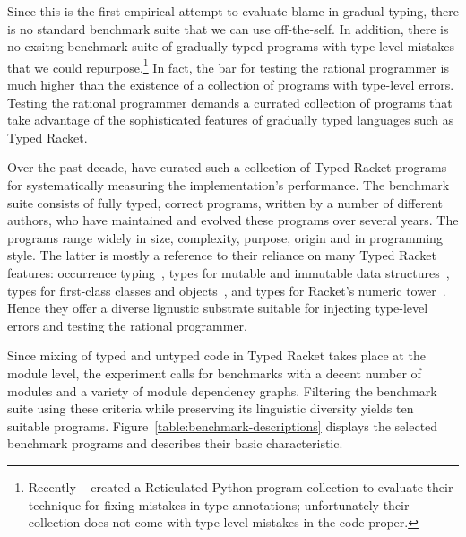 
Since this is the first empirical attempt to evaluate blame in gradual
typing, there is no standard benchmark suite that we can use off-the-self.
In addition, there is no exsitng benchmark suite of gradually typed
programs with type-level mistakes that we could
repurpose.\footnote{Recently ~\citet{cc-oopsla-20} created a
Reticulated Python program collection to evaluate their technique for
fixing mistakes in type annotations; unfortunately their collection does
not come with type-level mistakes in the code proper.} In fact, the bar
for testing the rational programmer is much higher than the existence of a
collection of programs with type-level errors. Testing the rational
programmer demands a currated collection of programs that take advantage
of the sophisticated features of gradually typed languages such as Typed
Racket. 

Over the past decade,  \citet{gtnffvf-jfp-2019} have curated such a
collection of Typed Racket programs for systematically measuring the
implementation's performance. The benchmark suite consists of fully typed,
correct programs, written by a number of different authors, who have
maintained and evolved these programs over several years. The programs
range widely in size, complexity, purpose, origin and in programming
style. The latter is mostly a reference to their reliance on many Typed
Racket features: occurrence typing~\cite{tf-icfp-2010}, types for mutable
and immutable data structures~\cite{hpst-sfp-2010}, types for first-class
classes and objects~\cite{tsdtf-oopsla-2012}, and types for Racket's
numeric tower~\cite{stathff-padl-12}. Hence they offer a diverse lignustic
substrate suitable for injecting type-level errors and testing the
rational programmer. 

Since mixing of typed and untyped code in Typed Racket takes place at the
module level, the experiment calls for benchmarks with a decent number of
modules and a variety of module dependency graphs. Filtering the benchmark
suite using these criteria while preserving its linguistic diversity
yields ten suitable programs. Figure~\ref{table:benchmark-descriptions}
displays the selected benchmark programs and describes their basic
characteristic. 
